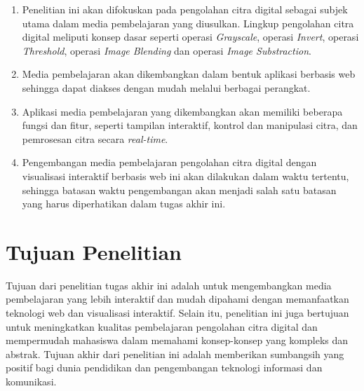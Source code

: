 \begin{enumerate}
	\item Penelitian ini akan difokuskan pada pengolahan citra digital sebagai subjek utama dalam media pembelajaran yang diusulkan. Lingkup pengolahan citra digital meliputi konsep dasar seperti operasi \textit{Grayscale}, operasi \textit{Invert}, operasi \textit{Threshold}, operasi \textit{Image Blending} dan operasi \textit{Image Substraction}.
	\item Media pembelajaran akan dikembangkan dalam bentuk aplikasi berbasis web sehingga dapat diakses dengan mudah melalui berbagai perangkat.
	\item Aplikasi media pembelajaran yang dikembangkan akan memiliki beberapa fungsi dan fitur, seperti tampilan interaktif, kontrol dan manipulasi citra, dan pemrosesan citra secara \textit{real-time}.
	\item Pengembangan media pembelajaran pengolahan citra digital dengan visualisasi interaktif berbasis web ini akan dilakukan dalam waktu tertentu, sehingga batasan waktu pengembangan akan menjadi salah satu batasan yang harus diperhatikan dalam tugas akhir ini.
\end{enumerate}

\section{Tujuan Penelitian}
Tujuan dari penelitian tugas akhir ini adalah untuk mengembangkan media pembelajaran yang lebih interaktif dan mudah dipahami dengan memanfaatkan teknologi web dan visualisasi interaktif. Selain itu, penelitian ini juga bertujuan untuk meningkatkan kualitas pembelajaran pengolahan citra digital dan mempermudah mahasiswa dalam memahami konsep-konsep yang kompleks dan abstrak. Tujuan akhir dari penelitian ini adalah memberikan sumbangsih yang positif bagi dunia pendidikan dan pengembangan teknologi informasi dan komunikasi.

